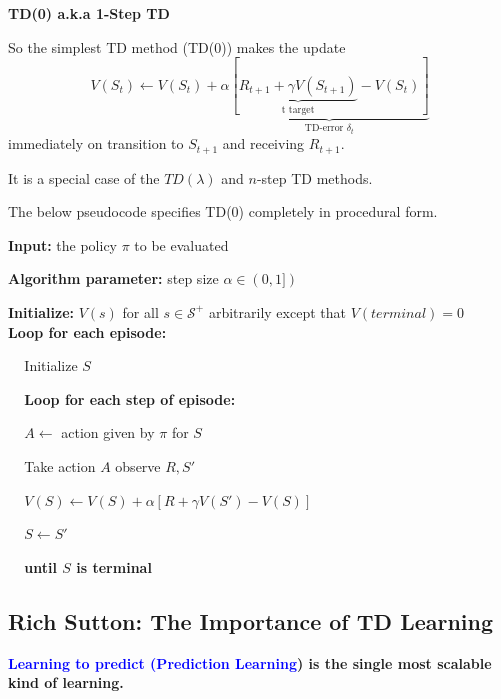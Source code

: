 \documentclass[12pt, a4paper]{article}
\begin{document}
\textbf{TD(0) a.k.a 1-Step TD}

So the simplest TD method (TD(0)) makes the update
$$V(S_t) \leftarrow V(S_t) + \alpha \underbrace{[\underbrace{R_{t+1} + \gamma V(S_{t+1})}_\text{t target} - V(S_t)]}_\text{TD-error $\delta_t$}$$
immediately on transition to $S_{t+1}$ and receiving $R_{t+1}$.

It is a special case of the $TD(\lambda)$ and $n$-step TD methods.

The below pseudocode specifies TD(0) completely in procedural form.



\begin{tcolorbox}[title={Tabular TD(0) for estimating $v_\pi$}]

\textbf{Input:} the policy $\pi$ to be evaluated

\textbf{Algorithm parameter:} step size $\alpha \in (0,1])$

\textbf{Initialize:} $V(s)$ for all $s \in \mathcal{S}^+$ arbitrarily except that $V (terminal) = 0$ \\

\textbf{Loop for each episode:}
\begin{description}
   \item $\;\;\;$ Initialize $S$
   \item $\;\;\;$ \textbf{Loop for each step of episode:}
   \begin{description}
     \item $\;\;\;$ $A \leftarrow$ action given by $\pi$ for $S$
     \item $\;\;\;$ Take action $A$ observe $R, S'$
     \item $\;\;\;$ $V(S) \leftarrow V(S) + \alpha [R + \gamma V(S') - V(S)]$
     \item $\;\;\;$ $S \leftarrow S'$
   \end{description}
   \item $\;\;\;$ \textbf{until $S$ is terminal}
\end{description}
\end{tcolorbox}






\subsection{Rich Sutton: The Importance of TD Learning}\label{the-importance-of-td-learning}


\textbf{\textcolor{blue}{Learning to predict (Prediction Learning}) is the single most scalable kind of learning.}
\end{document}

